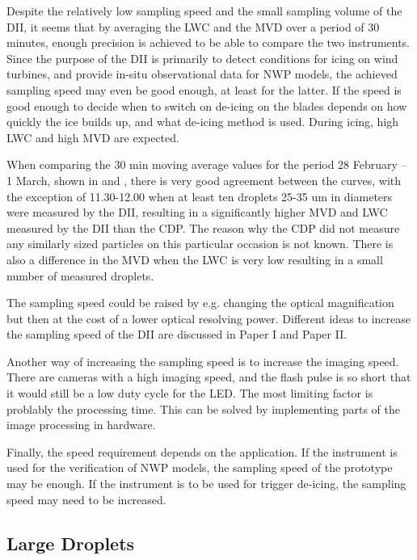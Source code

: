 Despite the relatively low sampling speed and the small sampling volume of the DII, it seems that by averaging the LWC and the MVD over a period of 30 minutes, enough precision is achieved to be able to compare the two instruments. Since the purpose of the DII is primarily to detect conditions for icing on wind turbines, and provide in-situ observational data for NWP models, the achieved sampling speed may even be good enough, at least for the latter. If the speed is good enough to decide when to switch on de-icing on the blades depends on how quickly the ice builds up, and what de-icing method is used. During icing, high LWC and high MVD are expected.

When comparing the 30 min moving average values for the period 28 February -- 1 March, shown in  and , there is very good agreement between the curves, with the exception of 11.30-12.00 when at least ten droplets 25-35 um in diameters were measured by the DII, resulting in a significantly higher MVD and LWC measured by the DII than the CDP. The reason why the CDP did not measure any similarly sized particles on this particular occasion is not known. There is also a difference in the MVD when the LWC is very low resulting in a small number of measured droplets.

The sampling speed could be raised by e.g. changing the optical magnification but then at the cost of a lower optical resolving power. Different ideas to increase the sampling speed of the DII are discussed in Paper I and Paper II.

Another way of increasing the sampling speed is to increase the imaging speed. There are cameras with a high imaging speed, and the flash pulse is so short that it would still be a low duty cycle for the LED. The most limiting factor is problably the processing time. This can be solved by implementing parts of the image processing in hardware.

Finally, the speed requirement depends on the application. If the instrument is used for the verification of NWP models, the sampling speed of the prototype may be enough. If the instrument is to be used for trigger de-icing, the sampling speed may need to be increased.

\subsection{Large Droplets}

